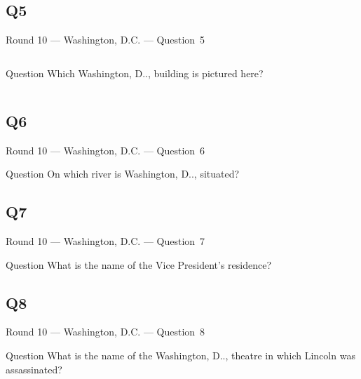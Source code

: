 \documentclass[11pt]{beamer}
\begin{document}
\subsection*{Q5}
\begin{frame}[t]{Round 10 --- Washington, D.C. --- \mbox{Question 5}}
\vspace{-0.5em}
\begin{columns}[T,totalwidth=\linewidth]
\begin{column}{0.32\linewidth}
\begin{block}{Question}
Which Washington, D.\@C.\@, building is pictured here?
\end{block}
\end{column}
\begin{column}{0.65\linewidth}
\begin{center}
\texttt{[image: \{Images/libraryofcongress]}.jpg}
\end{center}
\end{column}
\end{columns}
\end{frame}
\subsection*{Q6}
\begin{frame}[t]{Round 10 --- Washington, D.C. --- \mbox{Question 6}}
\vspace{-0.5em}
\begin{block}{Question}
On which river is Washington, D.\@C.\@, situated?
\end{block}
\end{frame}
\subsection*{Q7}
\begin{frame}[t]{Round 10 --- Washington, D.C. --- \mbox{Question 7}}
\vspace{-0.5em}
\begin{block}{Question}
What is the name of the Vice President's residence?
\end{block}
\end{frame}
\subsection*{Q8}
\begin{frame}[t]{Round 10 --- Washington, D.C. --- \mbox{Question 8}}
\vspace{-0.5em}
\begin{block}{Question}
What is the name of the Washington, D.\@C.\@, theatre in which Lincoln was assassinated?
\end{block}
\end{frame}
\end{document}
